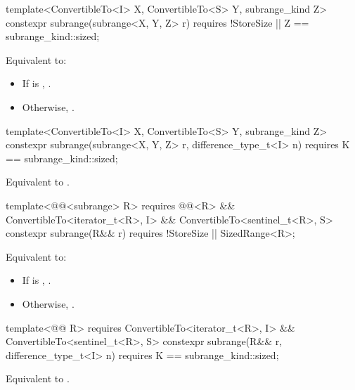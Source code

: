 {\color{oldclr}
%
\begin{itemdecl}
template<ConvertibleTo<I> X, ConvertibleTo<S> Y, subrange_kind Z>
constexpr subrange(subrange<X, Y, Z> r)
  requires !StoreSize || Z == subrange_kind::sized;
\end{itemdecl}

\begin{itemdescr}
\pnum
\effects Equivalent to:
\begin{itemize}
\item If  is ,
.
\item Otherwise, .
\end{itemize}
\end{itemdescr}

%
\begin{itemdecl}
template<ConvertibleTo<I> X, ConvertibleTo<S> Y, subrange_kind Z>
constexpr subrange(subrange<X, Y, Z> r, difference_type_t<I> n)
  requires K == subrange_kind::sized;
\end{itemdecl}

\begin{itemdescr}
\pnum
\effects Equivalent to .
\end{itemdescr}
} %

{\color{newclr}
%
\begin{itemdecl}
template<@@<subrange> R>
  requires @@<R> &&
    ConvertibleTo<iterator_t<R>, I> && ConvertibleTo<sentinel_t<R>, S>
constexpr subrange(R&& r) requires !StoreSize || SizedRange<R>;
\end{itemdecl}

\begin{itemdescr}
\pnum
\effects Equivalent to:
\begin{itemize}
\item If  is ,
.
\item Otherwise, .
\end{itemize}
\end{itemdescr}

%
\begin{itemdecl}
template<@@ R>
  requires ConvertibleTo<iterator_t<R>, I> && ConvertibleTo<sentinel_t<R>, S>
constexpr subrange(R&& r, difference_type_t<I> n)
  requires K == subrange_kind::sized;
\end{itemdecl}

\begin{itemdescr}
\pnum
\effects Equivalent to .
\end{itemdescr}
} %

